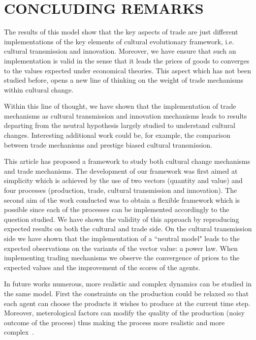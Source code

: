 \documentclass{wscpaperproc}
\begin{document}
\section{CONCLUDING REMARKS}

The results of this model show that the key aspects of trade are just different implementations of the key elements of cultural evolutionary framework, i.e. cultural transmission and innovation. Moreover, we have ensure that such an implementation is valid in the sense that it leads the prices of goods to converges to the values expected under economical theories. This aspect which has not been studied before, opens a new line of thinking on the weight of trade mechanisms within cultural change.

Within this line of thought, we have shown that the implementation of trade mechanisms as cultural transmission and innovation mechanisms leads to results departing from the neutral hypothesis largely studied to understand cultural changes. Interesting additional work could be, for example, the comparison between trade mechanisms and prestige biased cultural transmission.

This article has proposed a framework to study both cultural change mechanisms and trade mechanisms. The development of our framework was first aimed at simplicity which is achieved by the use of two vectors (quantity and value) and four processes (production, trade, cultural transmission and innovation). The second aim of the work conducted was to obtain a flexible framework which is possible since each of the processes can be implemented accordingly to the question studied. We have shown the validity of this approach by reproducing expected results on both the cultural and trade side. On the cultural transmission side we have shown that the implementation of a ``neutral model" leads to the expected observations on the variants of the vector value: a power law. When implementing trading mechanisms we observe the convergence of prices to the expected values and the improvement of the scores of the agents.

In future works numerous, more realistic and complex dynamics can be studied in the same model. First the constraints on the production could be relaxed so that each agent can choose the products it wishes to produce at the current time step. Moreover, meterological factors can modify the quality of the production (noisy outcome of the process) thus making the process more realistic and more complex~.
\end{document}
